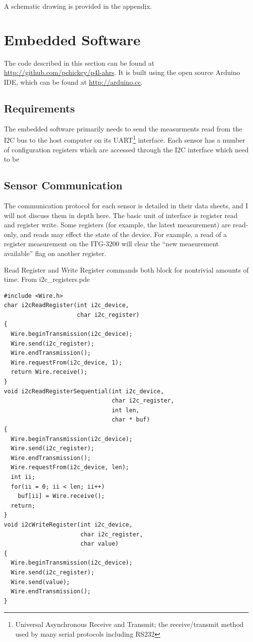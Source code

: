 \documentclass[12pt]{report}
\begin{document}

A schematic drawing is provided in the appendix. %

\lstset{language=C++,basicstyle=\ttfamily}
\section{Embedded Software}
The code described in this section can be found at \url{http://github.com/pchickey/p4l-ahrs}. It is built using the open source Arduino IDE, which can be found at \url{http://arduino.cc}.

\subsection{Requirements}
The embedded software primarily needs to send the measurments read from the I2C bus to the host computer on its 
UART\footnote{Universal Asynchronous Receive and Transmit; the receive/transmit method used by many serial protocols including RS232} 
interface. Each sensor has a number of configuration registers which are accessed through the I2C interface which need to be 

\subsection{Sensor Communication}

The communication protocol for each sensor is detailed in their data sheets, and I will not discuss them in depth here. The basic unit of interface is register read and register write. Some registers (for example, the latest measurement) are read-only, and reads may effect the state of the device. For example, a read of a register measurement on the ITG-3200 will clear the ``new measurement available'' flag on another register.   

Read Register and Write Register commands both block for nontrivial amounts of time.
\lstset{language=C++,basicstyle=\ttfamily}
From i2c\_registers.pde
\begin{lstlisting}
#include <Wire.h>
char i2cReadRegister(int i2c_device, 
                     char i2c_register)
{
  Wire.beginTransmission(i2c_device);
  Wire.send(i2c_register);
  Wire.endTransmission();
  Wire.requestFrom(i2c_device, 1);
  return Wire.receive();  
}
void i2cReadRegisterSequential(int i2c_device, 
                               char i2c_register, 
                               int len, 
                               char * buf)
{
  Wire.beginTransmission(i2c_device);
  Wire.send(i2c_register);
  Wire.endTransmission();
  Wire.requestFrom(i2c_device, len);
  int ii;
  for(ii = 0; ii < len; ii++)
    buf[ii] = Wire.receive();
  return;
}
void i2cWriteRegister(int i2c_device, 
                      char i2c_register, 
                      char value)
{
  Wire.beginTransmission(i2c_device);
  Wire.send(i2c_register);
  Wire.send(value);
  Wire.endTransmission();
}  
\end{lstlisting}
\end{document}
